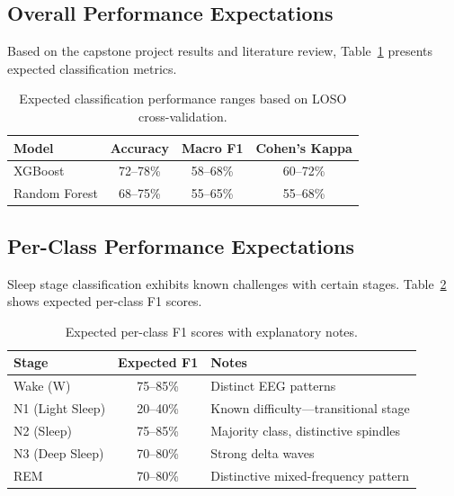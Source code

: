 \documentclass{imc-inf} %
\begin{document}
\subsection{Overall Performance Expectations}

Based on the capstone project results and literature review, Table~\ref{tab:expected_classification} presents expected classification metrics.

\begin{table}[ht]
\centering
\begin{tabular}{|l|c|c|c|}
\hline
\textbf{Model} & \textbf{Accuracy} & \textbf{Macro F1} & \textbf{Cohen's Kappa} \\
\hline
XGBoost & 72--78\% & 58--68\% & 60--72\% \\
\hline
Random Forest & 68--75\% & 55--65\% & 55--68\% \\
\hline
\end{tabular}
\caption{Expected classification performance ranges based on LOSO cross-validation.}
\label{tab:expected_classification}
\end{table}

\subsection{Per-Class Performance Expectations}

Sleep stage classification exhibits known challenges with certain stages. Table~\ref{tab:expected_per_class} shows expected per-class F1 scores.

\begin{table}[ht]
\centering
\begin{tabular}{|l|c|l|}
\hline
\textbf{Stage} & \textbf{Expected F1} & \textbf{Notes} \\
\hline
Wake (W) & 75--85\% & Distinct EEG patterns \\
\hline
N1 (Light Sleep) & 20--40\% & Known difficulty---transitional stage \\
\hline
N2 (Sleep) & 75--85\% & Majority class, distinctive spindles \\
\hline
N3 (Deep Sleep) & 70--80\% & Strong delta waves \\
\hline
REM & 70--80\% & Distinctive mixed-frequency pattern \\
\hline
\end{tabular}
\caption{Expected per-class F1 scores with explanatory notes.}
\label{tab:expected_per_class}
\end{table}
\end{document}
